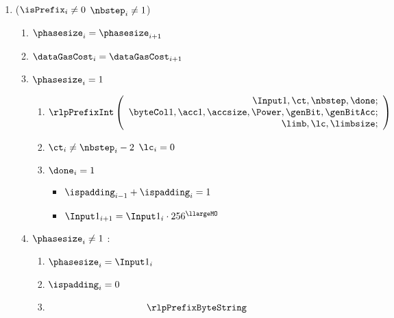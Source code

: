 \begin{enumerate}[resume] 
    \item \If ($\isPrefix_{i} \neq 0$ \et $\nbstep_{i} \neq 1$) \Then
        \begin{enumerate}
            \item $\phasesize_{i} = \phasesize_{i+1}$
            \item $\dataGasCost_{i} = \dataGasCost_{i+1}$
            \item \If $\phasesize_{i} = 1$ \Then
            \begin{enumerate}
                \item 
                    \[
                        \rlpPrefixInt
                        \left( \begin{array}{r}
                            \Input1,
                            \ct,
                            \nbstep,
                            \done; \\
                            \byteCol1,
                            \acc1,
                            \accsize,
                            \Power,
                            \genBit,
                            \genBitAcc; \\
                            \limb,
                            \lc,
                            \limbsize; \\
                        \end{array} \right)
                    \]
                \item \If $\ct_{i} \neq \nbstep_{i}-2$ \Then $\lc_{i}=0$
                \item \If $\done_{i}=1$ \Then
                    \begin{itemize}
                        \item $\ispadding_{i-1} + \ispadding_{i} = 1$
                        \item $\Input1_{i+1} = \Input1_{i} \cdot 256^{\llargeMO}$
                    \end{itemize}
            \end{enumerate}
            \item \If $\phasesize_{i} \neq 1$ \Then: 
            \begin{enumerate}
                \item $\phasesize_{i} = \Input1_{i}$
                \item $\ispadding_{i}=0$
                \item 
                    \[
                        \rlpPrefixByteString
\]
\end{enumerate}
\end{enumerate}
\end{enumerate}
